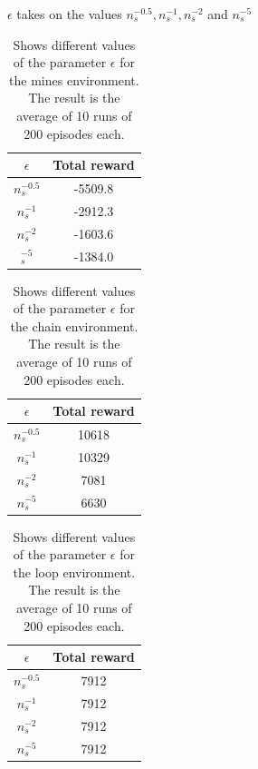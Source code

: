 \documentclass[11pt]{article}
\numberwithin{equation}{section}
\begin{document}
\begin{flushleft}
$\epsilon$ takes on the values $n_s^{-0.5},n_s^{-1},n_s^{-2}$ and $n_s^{-5}$

\text{ } \newline

\begin{table}[H]
\caption{Shows different values of the parameter $\epsilon$ for the mines environment. The result is the average of 10 runs of 200 episodes each.}
\begin{center}
\begin{tabular}{|c|c|}
\hline
$\epsilon$ & Total reward \\ \hline
$n_s^{-0.5}$ & -5509.8 \\ \hline
$n_s^{-1}$ & -2912.3 \\ \hline
$n_s^{-2}$ & -1603.6 \\ \hline
$_s^{-5}$ & -1384.0 \\
\hline
\end{tabular}
\label{tab:minesMean}
\end{center}
\end{table}

\text{ } \newline

\begin{table}[H]
\caption{Shows different values of the parameter $\epsilon$ for the chain environment. The result is the average of 10 runs of 200 episodes each.}
\begin{center}
\begin{tabular}{|c|c|}
\hline
$\epsilon$ & Total reward \\ \hline
$n_s^{-0.5}$ & 10618 \\ \hline
$n_s^{-1}$ & 10329 \\ \hline
$n_s^{-2}$ & 7081 \\ \hline
$n_s^{-5}$ & 6630 \\
\hline
\end{tabular}
\label{tab:chainMean}
\end{center}
\end{table}

\newpage

\text{ } \newline

\text{ } \newline

\begin{table}[H]
\caption{Shows different values of the parameter $\epsilon$ for the loop environment. The result is the average of 10 runs of 200 episodes each.}
\begin{center}
\begin{tabular}{|c|c|}
\hline
$\epsilon$ & Total reward \\ \hline
$n_s^{-0.5}$ & 7912 \\ \hline
$n_s^{-1}$ & 7912 \\ \hline
$n_s^{-2}$ & 7912 \\ \hline
$n_s^{-5}$ & 7912 \\
\hline
\end{tabular}
\label{tab:loopMean}
\end{center}
\end{table}


\end{flushleft}
\end{document}
